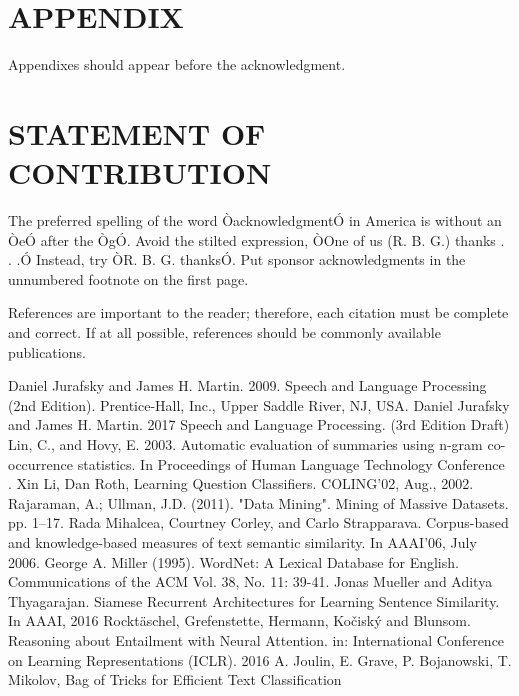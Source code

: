 \documentclass[letterpaper, 10 pt, conference]{ieeeconf}  %
\begin{document}
\section*{APPENDIX}

Appendixes should appear before the acknowledgment.

\section*{STATEMENT OF CONTRIBUTION}

The preferred spelling of the word ÒacknowledgmentÓ in America is without an ÒeÓ after the ÒgÓ. Avoid the stilted expression, ÒOne of us (R. B. G.) thanks . . .Ó  Instead, try ÒR. B. G. thanksÓ. Put sponsor acknowledgments in the unnumbered footnote on the first page.




References are important to the reader; therefore, each citation must be complete and correct. If at all possible, references should be commonly available publications.



\begin{thebibliography}{99}

 Daniel Jurafsky and James H. Martin. 2009. Speech and Language Processing (2nd Edition). Prentice-Hall, Inc., Upper Saddle River, NJ, USA.
 Daniel Jurafsky and James H. Martin. 2017 Speech and Language Processing. (3rd Edition Draft) 
 Lin, C., and Hovy, E. 2003. Automatic evaluation of summaries
using n-gram co-occurrence statistics. In Proceedings of Human
Language Technology Conference .
 Xin Li, Dan Roth, Learning Question Classifiers. COLING'02, Aug., 2002.
 Rajaraman, A.; Ullman, J.D. (2011). "Data Mining". Mining of Massive Datasets. pp. 1–17.
 Rada Mihalcea, Courtney Corley, and Carlo Strapparava. Corpus-based and knowledge-based measures of text semantic similarity. In AAAI’06, July 2006.
 George A. Miller (1995). WordNet: A Lexical Database for English. 
Communications of the ACM Vol. 38, No. 11: 39-41.
 Jonas Mueller and Aditya Thyagarajan. Siamese Recurrent Architectures for Learning Sentence Similarity. In AAAI, 2016
 Rocktäschel, Grefenstette, Hermann, Kočiský and Blunsom. Reasoning about Entailment with Neural Attention. in: International Conference on Learning Representations (ICLR). 2016
 A. Joulin, E. Grave, P. Bojanowski, T. Mikolov, Bag of Tricks for Efficient Text Classification



\end{thebibliography}
\end{document}
